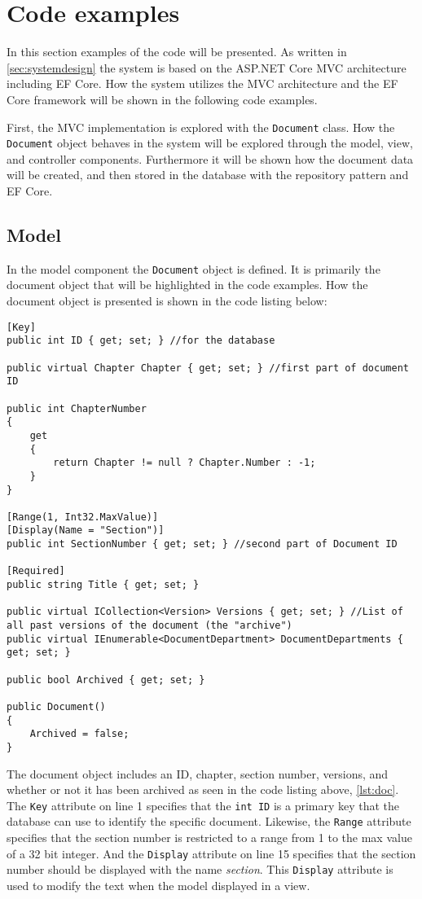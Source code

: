 \section{Code examples}\label{sec:codeexamples}
In this section examples of the code will be presented.
As written in \cref{sec:systemdesign} the system is based on the ASP.NET Core MVC architecture including EF Core.
How the system utilizes the MVC architecture and the EF Core framework will be shown in the following code examples.

First, the MVC implementation is explored with the \texttt{Document} class.
How the \texttt{Document} object behaves in the system will be explored through the model, view, and controller components.
Furthermore it will be shown how the document data will be created, and then stored in the database with the repository pattern and EF Core.

\subsection{Model}

In the model component the \texttt{Document} object is defined.
It is primarily the document object that will be highlighted in the code examples.
How the document object is presented is shown in the code listing below:
\\
\begin{lstlisting}[caption={Document Model: Document object}, label={lst:doc}]
[Key]
public int ID { get; set; } //for the database

public virtual Chapter Chapter { get; set; } //first part of document ID

public int ChapterNumber
{
	get
	{
		return Chapter != null ? Chapter.Number : -1;
	}
}

[Range(1, Int32.MaxValue)]
[Display(Name = "Section")]
public int SectionNumber { get; set; } //second part of Document ID

[Required]
public string Title { get; set; }

public virtual ICollection<Version> Versions { get; set; } //List of all past versions of the document (the "archive")
public virtual IEnumerable<DocumentDepartment> DocumentDepartments { get; set; }

public bool Archived { get; set; }

public Document()
{
	Archived = false;
}
\end{lstlisting}

The document object includes an ID, chapter, section number, versions, and whether or not it has been archived as seen in the code listing above, \cref{lst:doc}.
The \texttt{Key} attribute on line 1 specifies that the \texttt{int ID} is a primary key that the database can use to identify the specific document.
Likewise, the \texttt{Range} attribute specifies that the section number is restricted to a range from 1 to the max value of a 32 bit integer.
And the \texttt{Display} attribute on line 15 specifies that the section number should be displayed with the name \textit{section}.
This \texttt{Display} attribute is used to modify the text when the model displayed in a view.

